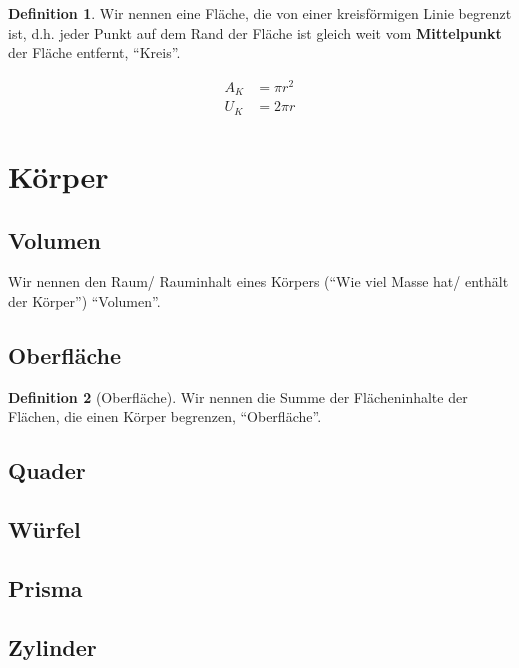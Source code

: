 \documentclass[a4paper]{book}%
\theoremstyle{definition}
\newtheorem{definition}{Definition}
\begin{document}
\begin{definition}
    Wir nennen eine Fläche, die von einer kreisförmigen Linie begrenzt ist, d.h. jeder Punkt auf dem Rand der Fläche ist gleich weit vom \textbf{Mittelpunkt} der Fläche entfernt, \enquote{Kreis}.
\end{definition}

\begin{align}\label{eqn:Kreis}
  A_K &= \pi r^2 \\
  U_K &= 2 \pi r
\end{align}



\section{Körper}

\subsection{Volumen}\label{Volumen}

Wir nennen den Raum/ Rauminhalt eines Körpers (\enquote{Wie viel Masse hat/ enthält der Körper}) \enquote{Volumen}.


\subsection{Oberfläche}\label{Oberfläche}

\begin{definition}[Oberfläche]
    Wir nennen die Summe der Flächeninhalte der Flächen, die einen Körper begrenzen, \enquote{Oberfläche}.
\end{definition}




\subsection{Quader}\label{Quader}

\subsection{Würfel}\label{Würfel}

\subsection{Prisma}\label{Prisma}

\subsection{Zylinder}\label{Zylinder}
\end{document}
